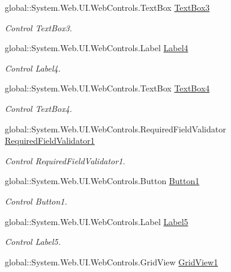 \begin{DoxyCompactItemize}
global\+::\+System.\+Web.\+U\+I.\+Web\+Controls.\+Text\+Box \mbox{\hyperlink{classInicio_1_1Alumno_1_1InstanciarTarea_a006a822d84d6740bbccbd2f56324c4fe}{Text\+Box3}}
\begin{DoxyCompactList}\small\item\em Control Text\+Box3. \end{DoxyCompactList}\item 
global\+::\+System.\+Web.\+U\+I.\+Web\+Controls.\+Label \mbox{\hyperlink{classInicio_1_1Alumno_1_1InstanciarTarea_a3a641901193c0d2e44c4d54cd1c9a0b5}{Label4}}
\begin{DoxyCompactList}\small\item\em Control Label4. \end{DoxyCompactList}\item 
global\+::\+System.\+Web.\+U\+I.\+Web\+Controls.\+Text\+Box \mbox{\hyperlink{classInicio_1_1Alumno_1_1InstanciarTarea_a3b1e002c68f16a23a0bf3bb48cd09b27}{Text\+Box4}}
\begin{DoxyCompactList}\small\item\em Control Text\+Box4. \end{DoxyCompactList}\item 
global\+::\+System.\+Web.\+U\+I.\+Web\+Controls.\+Required\+Field\+Validator \mbox{\hyperlink{classInicio_1_1Alumno_1_1InstanciarTarea_a1e423dc085c8909b5fdc7f7183b93614}{Required\+Field\+Validator1}}
\begin{DoxyCompactList}\small\item\em Control Required\+Field\+Validator1. \end{DoxyCompactList}\item 
global\+::\+System.\+Web.\+U\+I.\+Web\+Controls.\+Button \mbox{\hyperlink{classInicio_1_1Alumno_1_1InstanciarTarea_a6753e6c05b605f57086ab872578943f6}{Button1}}
\begin{DoxyCompactList}\small\item\em Control Button1. \end{DoxyCompactList}\item 
global\+::\+System.\+Web.\+U\+I.\+Web\+Controls.\+Label \mbox{\hyperlink{classInicio_1_1Alumno_1_1InstanciarTarea_a9c2f576a6d6cc1378c528d55053736c4}{Label5}}
\begin{DoxyCompactList}\small\item\em Control Label5. \end{DoxyCompactList}\item 
global\+::\+System.\+Web.\+U\+I.\+Web\+Controls.\+Grid\+View \mbox{\hyperlink{classInicio_1_1Alumno_1_1InstanciarTarea_a9cbdd81cbaa261dd71a3eb9709beb460}{Grid\+View1}}

\end{DoxyCompactItemize}

